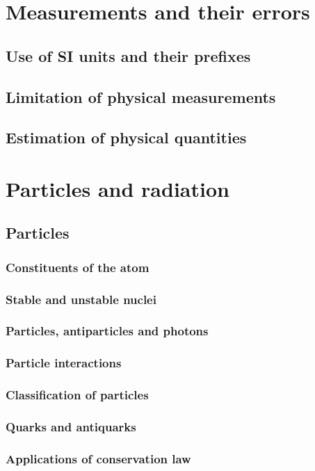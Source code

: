 \part{Measurements and their errors}
\chapter{Use of SI units and their prefixes}
\chapter{Limitation of physical measurements}
\chapter{Estimation of physical quantities}


\part{Particles and radiation}
\chapter{Particles}
\section{Constituents of the atom}
\section{Stable and unstable nuclei}
\section{Particles, antiparticles and photons}
\section{Particle interactions}
\section{Classification of particles}
\section{Quarks and antiquarks}
\section{Applications of conservation law}

